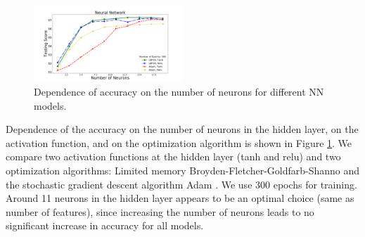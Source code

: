 \begin{figure}[h]
\hspace*{-0.5cm}
\includegraphics[width=0.5\textwidth]{plots/nn_train_neurons_assocnewfeat.pdf}
\caption{Dependence of accuracy on the number of neurons for different NN models.}
\label{fig:NN_neurons}
\end{figure}

Dependence of the accuracy on the number of neurons in the hidden layer, on the activation function, 
and on the optimization algorithm is shown in Figure \ref{fig:NN_neurons}. 
We compare two activation functions at the hidden layer (tanh and relu) and two optimization algorithms: Limited memory Broyden-Fletcher-Goldfarb-Shanno \citep[LBFGS,][]{lbfgs} and the stochastic gradient descent algorithm Adam \citep{2014arXiv1412.6980K}.
We use 300 epochs for training.
Around 11 neurons in the hidden layer appears to be an optimal choice (same as number of features), since increasing the number of neurons leads to no significant increase in accuracy for all models. 

